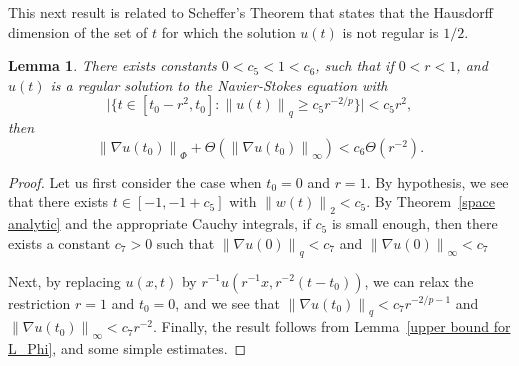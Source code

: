 \documentclass[12pt]{amsart}
\newtheorem{lemma}[thm]{Lemma}
\theoremstyle{remark}
\newcommand{\smodo}[1]{{\mathopen|#1\mathclose|}}
\newcommand{\snormo}[1]{{\mathopen\|#1\mathclose\|}}
\begin{document}
This next result is related to Scheffer's Theorem \cite{scheffer} 
that states that the Hausdorff dimension
of the set of $t$ for which the solution $u(t)$ is not regular is
$1/2$.

\begin{lemma}  \label{localization}
There exists constants
$0<c_5<1<c_6$, such
that if $0<r<1$, and
$u(t)$ is a regular
solution
to the Navier-Stokes equation with
$$ \smodo{\{t \in [t_0-r^2,t_0] : \snormo{u(t)}_q \ge c_5 r^{-2/p}\}} 
   < c_5 r^2 ,$$
then
$$ \snormo{\nabla u(t_0)}_{\Phi}
   + \Theta(\snormo{\nabla u(t_0)}_\infty)
   < c_6 \Theta(r^{-2}) .$$
\end{lemma}

\begin{proof}
Let us first consider the case when $t_0 = 0$ and $r = 1$.
By hypothesis, we see that there exists
$t \in [-1,-1+c_5]$
with
$ \snormo{w(t)}_2 < c_5$.  
By Theorem~\ref{space analytic} and the appropriate Cauchy integrals, 
if $c_5$
is small enough, then there exists a constant $c_7>0$ such that
$\snormo{\nabla u(0)}_q < c_7$  
and
$\snormo{\nabla u(0)}_\infty < c_7$  

Next, by replacing 
$u(x,t)$
by
$r^{-1} u(r^{-1}x,r^{-2}(t-t_0))$, we can relax the restriction $r=1$ and
$t_0=0$, and we see that
$\snormo{\nabla u(t_0)}_q < c_7 r^{-2/p-1}$
and
$\snormo{\nabla u(t_0)}_{\infty} < c_7 r^{-2}$.
Finally, the result follows
from Lemma~\ref{upper bound for L_Phi},
and some simple estimates.
\end{proof}
\end{document}

